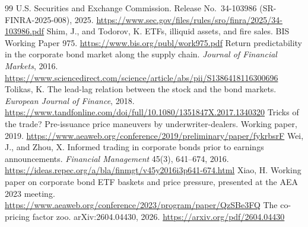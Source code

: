 \documentclass[11pt,letterpaper]{article}
\begin{document}
\begin{thebibliography}{99}
 U.S. Securities and Exchange Commission. Release No.\ 34-103986 (SR-FINRA-2025-008), 2025. \url{https://www.sec.gov/files/rules/sro/finra/2025/34-103986.pdf}
 Shim, J., and Todorov, K. ETFs, illiquid assets, and fire sales. BIS Working Paper 975. \url{https://www.bis.org/publ/work975.pdf}
 Return predictability in the corporate bond market along the supply chain. \emph{Journal of Financial Markets}, 2016. \url{https://www.sciencedirect.com/science/article/abs/pii/S1386418116300696}
 Tolikas, K. The lead-lag relation between the stock and the bond markets. \emph{European Journal of Finance}, 2018. \url{https://www.tandfonline.com/doi/full/10.1080/1351847X.2017.1340320}
 Tricks of the trade? Pre-issuance price maneuvers by underwriter-dealers. Working paper, 2019. \url{https://www.aeaweb.org/conference/2019/preliminary/paper/fykrbsrF}
 Wei, J., and Zhou, X. Informed trading in corporate bonds prior to earnings announcements. \emph{Financial Management} 45(3), 641--674, 2016. \url{https://ideas.repec.org/a/bla/finmgt/v45y2016i3p641-674.html}
 Xiao, H. Working paper on corporate bond ETF baskets and price pressure, presented at the AEA 2023 meeting. \url{https://www.aeaweb.org/conference/2023/program/paper/QzSBe3FQ}
 The co-pricing factor zoo. arXiv:2604.04430, 2026. \url{https://arxiv.org/pdf/2604.04430}
\end{thebibliography}
\end{document}
